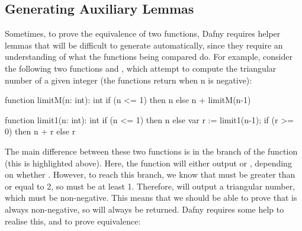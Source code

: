 \subsection{Generating Auxiliary Lemmas}\label{sec:auxiliary-lemmas}

Sometimes, to prove the equivalence of two functions, Dafny requires helper lemmas that will be difficult to generate automatically, since they require an understanding of what the functions being compared do. For example, consider the following two functions  and , which attempt to compute the triangular number of a given integer  (the functions return  when n is negative):

\begin{dafny}[highlightlines=9-11]
function limitM(n: int): int {
  if (n <= 1) then n
  else n + limitM(n-1)
}

function limit1(n: int): int {
  if (n <= 1) then n
  else
    var r := limit1(n-1);
    if (r >= 0) then n + r
    else r
}
\end{dafny}
%
The main difference between these two functions is in the  branch of the  function (this is highlighted above). Here, the function will either output  or , depending on whether . However, to reach this  branch, we know that  must be greater than or equal to 2, so  must be at least 1. Therefore,  will output a triangular number, which must be non-negative. This means that we should be able to prove that  is always non-negative, so  will always be returned. Dafny requires some help to realise this, and to prove equivalence:


